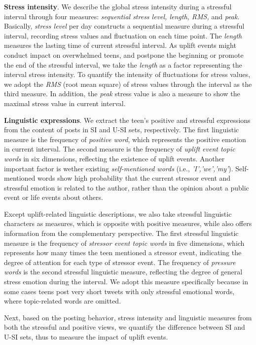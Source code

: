\textbf{Stress intensity}.
We describe the global stress intensity during a stressful interval through four measures:
\emph{sequential stress level, length, RMS,} and \emph{peak}.
Basically, \emph{stress level} per day constructs a sequential measure during a stressful interval,
recording stress values and fluctuation on each time point.
The \emph{length} measures the lasting time of current stressful interval.
As uplift events might conduct impact on overwhelmed teens,
and postpone the beginning or promote the end of the stressful interval,
we take the \emph{length} as a factor representing the interval stress intensity.
To quantify the intensity of fluctuations for stress values,
we adopt the \emph{RMS} (root mean square) of stress values through the interval as the third measure.
In addition, the \emph{peak} stress value is also a measure to show the maximal stress value in current interval.

\textbf{Linguistic expressions}.
We extract the teen's positive and stressful expressions from the content of posts in SI and U-SI sets, respectively.
The first linguistic measure is the frequency of \emph{positive word},
which represents the positive emotion in current interval.
The second measure is the frequency of \emph{uplift event topic words} in six dimensions,
reflecting the existence of uplift events.
Another important factor is wether existing \emph{self-mentioned words} (i.e., \emph{'I','we','my'}).
Self-mentioned words show high probability that the current stressor event and stressful emotion is related to the author,
rather than the opinion about a public event or life events about others.

Except uplift-related linguistic descriptions, we also take stressful linguistic characters as measures,
which is opposite with positive measures, while also offers information from the complementary perspective.
The first stressful linguistic measure is the frequency of \emph{stressor event topic words} in five dimensions,
which represents how many times the teen mentioned a stressor event,
indicating the degree of attention for each type of stressor event.
The frequency of \emph{pressure words} is the second stressful linguistic measure,
reflecting the degree of general stress emotion during the interval.
We adopt this measure specifically because in some cases teens post very short tweets with only stressful emotional words,
where topic-related words are omitted.

Next,
based on the posting behavior, stress intensity and linguistic measures from both the stressful and positive views,
we quantify the difference between SI and U-SI sets, thus to measure the impact of uplift events.

